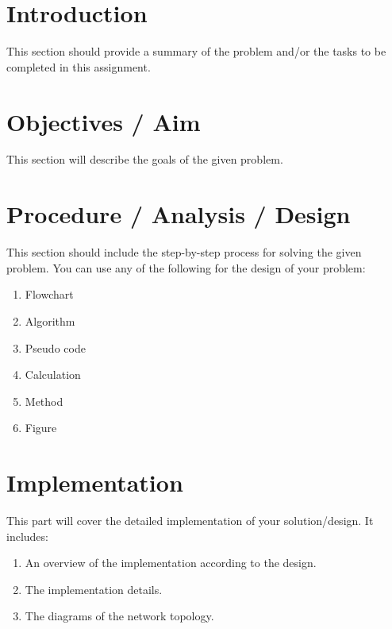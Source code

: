 \documentclass[12pt]{report}
\begin{document}
    
    \maketitle

    \label{task:task1} %
    
    \section{Introduction}
    This section should provide a summary of the problem and/or the tasks to be completed in this assignment.

    \section{Objectives / Aim}
    This section will describe the goals of the given problem.

    \section{Procedure / Analysis / Design}
    This section should include the step-by-step process for solving the given problem. You can use any of the following for the design of your problem: 
    \begin{enumerate}
        \item Flowchart
        \item Algorithm
        \item Pseudo code
        \item Calculation
        \item Method
        \item Figure
    \end{enumerate}

    \section{Implementation}
    This part will cover the detailed implementation of your solution/design. It includes:   
    \begin{enumerate}
        \item An overview of the implementation according to the design.
        \item The implementation details.
        \item The diagrams of the network topology.
    \end{enumerate}
\end{document}
